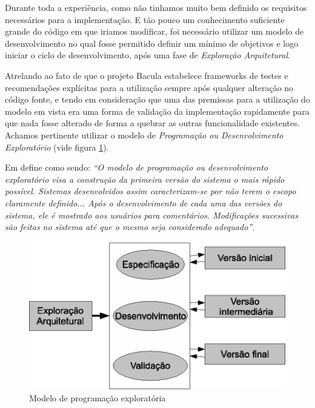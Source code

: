 Durante toda a experiência, como não tinhamos muito bem definido os requisitos necessários para a implementação. E tão pouco um conhecimento suficiente grande do código em que iriamos modificar, foi necessário utilizar um modelo de desenvolvimento no qual fosse permitido definir um mínimo de objetivos e logo iniciar o ciclo de desenvolvimento, após uma fase de \textit{Exploração Arquitetural}. 

Atrelando ao fato de que o projeto Bacula estabelece frameworks de testes e recomendações explícitas para a utilização sempre após qualquer alteração no código fonte, e tendo em consideração que uma das premissas para a utilização do modelo em vista era uma forma de validação da implementação rapidamente para que nada fosse alterado de forma a quebrar as outras funcionalidade existentes. Achamos pertinente utilizar o modelo de \textit{Programação ou Desenvolvimento Exploratório} (vide figura \ref{fig:exploratoria}). 

Em \cite[página 31]{engenharia1} define como sendo: \textit{``O modelo de programação ou desenvolvimento exploratório visa a construção da primeira versão do sistema o mais rápido possível. Sistemas desenvolvidos assim caracterizam-se por não terem o escopo claramente definido... Após o desenvolvimento de cada uma das versões do sistema, ele é mostrado aos usuários para comentários. Modificações sucessivas são feitas no sistema até que o mesmo seja considerado adequado''}.

\begin{figure}[h]
 \centering
 \includegraphics{../../doc/diagramas/programacao_exploratoria.eps}
 \caption[Programação exploratória]{Modelo de programação exploratória \cite{engenharia1}}
 \label{fig:exploratoria}
\end{figure}

